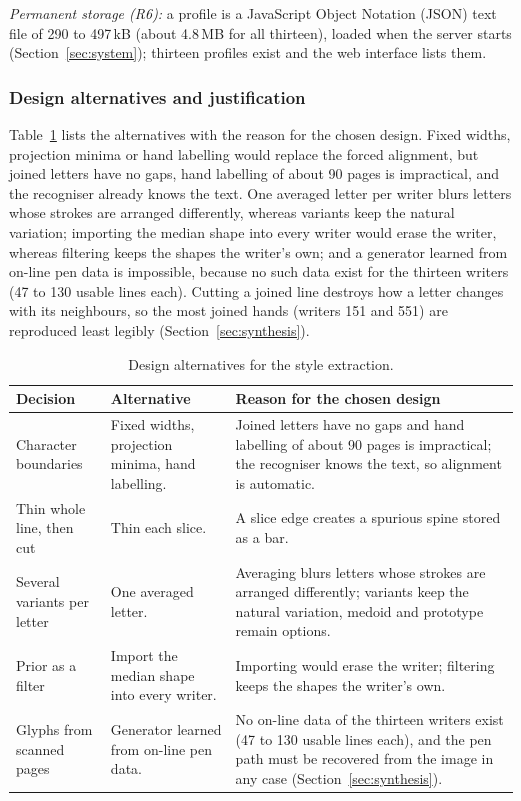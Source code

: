 \emph{Permanent storage (R6):} a profile is a JavaScript Object Notation (JSON) text file of 290 to 497\,kB (about 4.8\,MB for all thirteen), loaded when the server starts (Section~\ref{sec:system}); thirteen profiles exist and the web interface lists them.

\subsubsection{Design alternatives and justification}

Table~\ref{tab:sty-alt} lists the alternatives with the reason for the chosen design.
Fixed widths, projection minima or hand labelling would replace the forced alignment, but joined letters have no gaps, hand labelling of about 90 pages is impractical, and the recogniser already knows the text.
One averaged letter per writer blurs letters whose strokes are arranged differently, whereas variants keep the natural variation; importing the median shape into every writer would erase the writer, whereas filtering keeps the shapes the writer's own; and a generator learned from on-line pen data is impossible, because no such data exist for the thirteen writers (47 to 130 usable lines each).
Cutting a joined line destroys how a letter changes with its neighbours, so the most joined hands (writers 151 and 551) are reproduced least legibly (Section~\ref{sec:synthesis}).

\begin{table}[!htbp]
\centering
\fontsize{9.5}{11.5}\selectfont
\begin{tabularx}{\linewidth}{|p{3.0cm}|X|X|}
\hline
\textbf{Decision} & \textbf{Alternative} & \textbf{Reason for the chosen design} \\
\hline
Character boundaries & Fixed widths, projection minima, hand labelling. & Joined letters have no gaps and hand labelling of about 90 pages is impractical; the recogniser knows the text, so alignment is automatic. \\
\hline
Thin whole line, then cut & Thin each slice. & A slice edge creates a spurious spine stored as a bar. \\
\hline
Several variants per letter & One averaged letter. & Averaging blurs letters whose strokes are arranged differently; variants keep the natural variation, medoid and prototype remain options. \\
\hline
Prior as a filter & Import the median shape into every writer. & Importing would erase the writer; filtering keeps the shapes the writer's own. \\
\hline
Glyphs from scanned pages & Generator learned from on-line pen data. & No on-line data of the thirteen writers exist (47 to 130 usable lines each), and the pen path must be recovered from the image in any case (Section~\ref{sec:synthesis}). \\
\hline
\end{tabularx}
\caption{Design alternatives for the style extraction.}
\label{tab:sty-alt}
\end{table}

